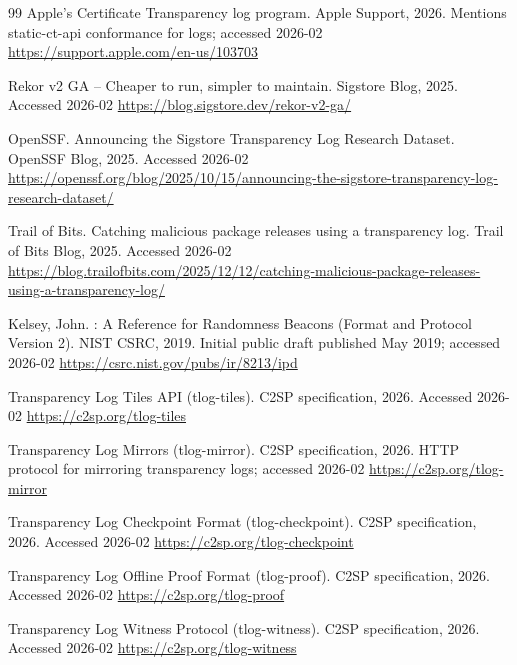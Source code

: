 \documentclass[11pt]{article}
\begin{document}
\begin{thebibliography}{99}
\newblock Apple's Certificate Transparency log program.
\newblock Apple Support, 2026.
\newblock Mentions {static-ct-api} conformance for logs; accessed 2026-02
\newblock \url{https://support.apple.com/en-us/103703}

\newblock Rekor v2 GA -- Cheaper to run, simpler to maintain.
\newblock Sigstore Blog, 2025.
\newblock Accessed 2026-02
\newblock \url{https://blog.sigstore.dev/rekor-v2-ga/}

{OpenSSF}.
\newblock Announcing the Sigstore Transparency Log Research Dataset.
\newblock OpenSSF Blog, 2025.
\newblock Accessed 2026-02
\newblock \url{https://openssf.org/blog/2025/10/15/announcing-the-sigstore-transparency-log-research-dataset/}

{Trail of Bits}.
\newblock Catching malicious package releases using a transparency log.
\newblock Trail of Bits Blog, 2025.
\newblock Accessed 2026-02
\newblock \url{https://blog.trailofbits.com/2025/12/12/catching-malicious-package-releases-using-a-transparency-log/}

Kelsey, John.
: A Reference for Randomness Beacons (Format and Protocol Version 2).
\newblock NIST CSRC, 2019.
\newblock Initial public draft published May 2019; accessed 2026-02
\newblock \url{https://csrc.nist.gov/pubs/ir/8213/ipd}

\newblock Transparency Log Tiles API (tlog-tiles).
\newblock C2SP specification, 2026.
\newblock Accessed 2026-02
\newblock \url{https://c2sp.org/tlog-tiles}

\newblock Transparency Log Mirrors (tlog-mirror).
\newblock C2SP specification, 2026.
\newblock HTTP protocol for mirroring transparency logs; accessed 2026-02
\newblock \url{https://c2sp.org/tlog-mirror}

\newblock Transparency Log Checkpoint Format (tlog-checkpoint).
\newblock C2SP specification, 2026.
\newblock Accessed 2026-02
\newblock \url{https://c2sp.org/tlog-checkpoint}

\newblock Transparency Log Offline Proof Format (tlog-proof).
\newblock C2SP specification, 2026.
\newblock Accessed 2026-02
\newblock \url{https://c2sp.org/tlog-proof}

\newblock Transparency Log Witness Protocol (tlog-witness).
\newblock C2SP specification, 2026.
\newblock Accessed 2026-02
\newblock \url{https://c2sp.org/tlog-witness}


\end{thebibliography}
\end{document}
